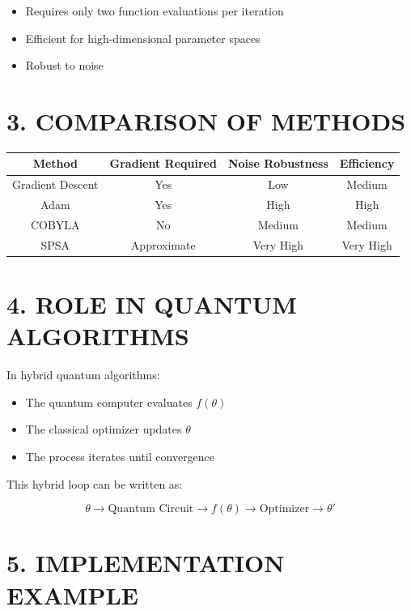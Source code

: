 \begin{itemize}
\item Requires only two function evaluations per iteration
\item Efficient for high-dimensional parameter spaces
\item Robust to noise
\end{itemize}

\vspace{0.5cm}

\section*{3. COMPARISON OF METHODS}

\begin{center}
\begin{tabular}{|c|c|c|c|}
\hline
Method & Gradient Required & Noise Robustness & Efficiency \\
\hline
Gradient Descent & Yes & Low & Medium \\
Adam & Yes & High & High \\
COBYLA & No & Medium & Medium \\
SPSA & Approximate & Very High & Very High \\
\hline
\end{tabular}
\end{center}

\vspace{0.5cm}

\section*{4. ROLE IN QUANTUM ALGORITHMS}

In hybrid quantum algorithms:

\begin{itemize}
\item The quantum computer evaluates $f(\theta)$
\item The classical optimizer updates $\theta$
\item The process iterates until convergence
\end{itemize}

This hybrid loop can be written as:

\[
\theta \rightarrow \text{Quantum Circuit} \rightarrow f(\theta) \rightarrow \text{Optimizer} \rightarrow \theta'
\]

\vspace{0.5cm}

\section*{5. IMPLEMENTATION EXAMPLE}

